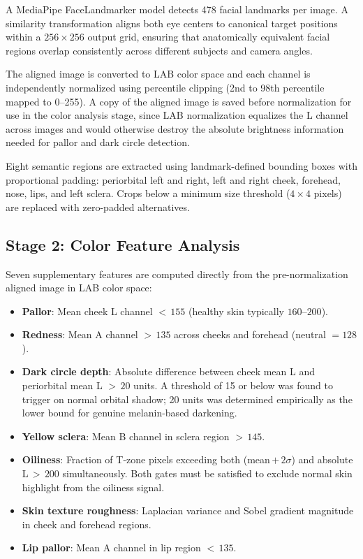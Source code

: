 \documentclass[journal]{IEEEtran}
\begin{document}
A MediaPipe FaceLandmarker model \cite{mediapipe2023} detects 478 facial
landmarks per image. A similarity transformation aligns both eye centers to
canonical target positions within a $256 \times 256$ output grid, ensuring
that anatomically equivalent facial regions overlap consistently across
different subjects and camera angles.

The aligned image is converted to LAB color space and each channel is
independently normalized using percentile clipping (2nd to 98th percentile
mapped to 0--255). A copy of the aligned image is saved before normalization
for use in the color analysis stage, since LAB normalization equalizes the
L channel across images and would otherwise destroy the absolute brightness
information needed for pallor and dark circle detection.

Eight semantic regions are extracted using landmark-defined bounding boxes
with proportional padding: periorbital left and right, left and right cheek,
forehead, nose, lips, and left sclera. Crops below a minimum size threshold
($4 \times 4$ pixels) are replaced with zero-padded alternatives.

\subsection{Stage 2: Color Feature Analysis}

Seven supplementary features are computed directly from the pre-normalization
aligned image in LAB color space:

\begin{itemize}
  \item \textbf{Pallor}: Mean cheek L channel $<\,155$ (healthy skin typically
    $160$--$200$).
  \item \textbf{Redness}: Mean A channel $>\,135$ across cheeks and forehead
    (neutral $= 128$).
  \item \textbf{Dark circle depth}: Absolute difference between cheek mean L
    and periorbital mean L $>\,20$ units. A threshold of 15 or below was found
    to trigger on normal orbital shadow; 20 units was determined empirically as
    the lower bound for genuine melanin-based darkening.
  \item \textbf{Yellow sclera}: Mean B channel in sclera region $>\,145$.
  \item \textbf{Oiliness}: Fraction of T-zone pixels exceeding both
    (mean\,$+\,2\sigma$) and absolute L\,$>\,200$ simultaneously. Both gates
    must be satisfied to exclude normal skin highlight from the oiliness signal.
  \item \textbf{Skin texture roughness}: Laplacian variance and Sobel gradient
    magnitude in cheek and forehead regions.
  \item \textbf{Lip pallor}: Mean A channel in lip region $<\,135$.
\end{itemize}
\end{document}
